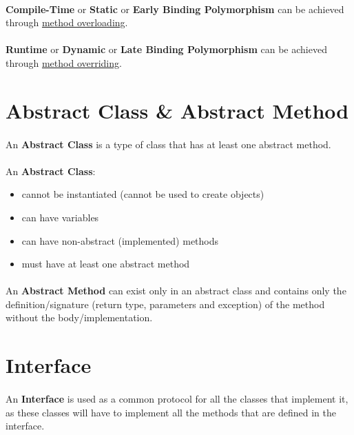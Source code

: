 \documentclass{article}
\begin{document}
\paragraph{} \textbf{Compile-Time} or \textbf{Static} or \textbf{Early Binding Polymorphism} can be achieved through \hyperref[sec:method-overloading]{method overloading}.
\paragraph{} \textbf{Runtime} or \textbf{Dynamic} or \textbf{Late Binding Polymorphism} can be achieved through \hyperref[sec:method-overriding]{method overriding}.


\newpage
\section{Abstract Class \& Abstract Method}
\label{sec:abstract-class}
\label{sec:abstract-method}
\paragraph{} An \textbf{Abstract Class} is a type of class that has at least one abstract method.
\paragraph{} An \textbf{Abstract Class}:
\begin{itemize}
	\item cannot be instantiated (cannot be used to create objects)
	\item can have variables
	\item can have non-abstract (implemented) methods
	\item must have at least one abstract method
\end{itemize}
\paragraph{} An \textbf{Abstract Method} can exist only in an abstract class and contains only the definition/signature (return type, parameters and exception) of the method without the body/implementation.


\section{Interface}
\label{sec:interface}
\paragraph{} An \textbf{Interface} is used as a common protocol for all the classes that implement it, as these classes will have to implement all the methods that are defined in the interface.
\end{document}
